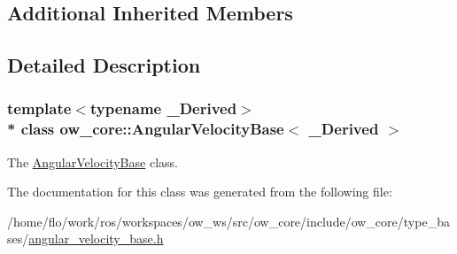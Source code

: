 \subsection*{Additional Inherited Members}


\subsection{Detailed Description}
\subsubsection*{template$<$typename \+\_\+\+Derived$>$\\*
class ow\+\_\+core\+::\+Angular\+Velocity\+Base$<$ \+\_\+\+Derived $>$}

The \hyperlink{classow__core_1_1AngularVelocityBase}{Angular\+Velocity\+Base} class. 

The documentation for this class was generated from the following file\+:\begin{DoxyCompactItemize}
\item 
/home/flo/work/ros/workspaces/ow\+\_\+ws/src/ow\+\_\+core/include/ow\+\_\+core/type\+\_\+bases/\hyperlink{angular__velocity__base_8h}{angular\+\_\+velocity\+\_\+base.\+h}\end{DoxyCompactItemize}
